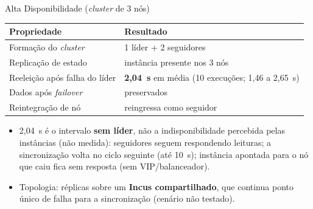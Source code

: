 \documentclass[aspectratio=169,xcolor=table]{beamer}
\begin{document}
\begin{frame}{Alta Disponibilidade (\textit{cluster} de 3 nós)}
    \begin{table}
        \centering
        \begin{tabular}{ll}
            \toprule
            \textbf{Propriedade} & \textbf{Resultado} \\
            \midrule
            Formação do \textit{cluster} & 1 líder + 2 seguidores \\
            Replicação de estado & instância presente nos 3 nós \\
            Reeleição após falha do líder & \textbf{2{,}04~s} em média (10 execuções; 1{,}46 a 2{,}65~s) \\
            Dados após \textit{failover} & preservados \\
            Reintegração de nó & reingressa como seguidor \\
            \bottomrule
        \end{tabular}
    \end{table}
    \vspace{0.3cm}
    \begin{itemize}
        \item 2{,}04~s é o intervalo \textbf{sem líder}, não a indisponibilidade
              percebida pelas instâncias (não medida): seguidores seguem respondendo
              leituras; a sincronização volta no ciclo seguinte (até 10~s); instância
              apontada para o nó que caiu fica sem resposta (sem VIP/balanceador).
        \item Topologia: réplicas sobre um \textbf{Incus compartilhado}, que continua
              ponto único de falha para a sincronização (cenário não testado).
    \end{itemize}
\end{frame}
\end{document}
